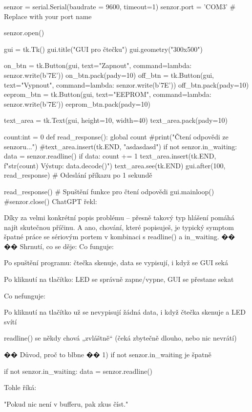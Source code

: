 senzor = serial.Serial(baudrate = 9600, timeout=1)
senzor.port = 'COM3'  # Replace with your port name

senzor.open()

gui = tk.Tk()
gui.title("GUI pro čtečku")
gui.geometry("300x500")

on_btn = tk.Button(gui, text="Zapnout", command=lambda: senzor.write(b'\x7E\xEA\xAB\xCD'))
on_btn.pack(pady=10)
off_btn = tk.Button(gui, text="Vypnout", command=lambda: senzor.write(b'\x7E\xAB\xCD'))
off_btn.pack(pady=10)
eeprom_btn = tk.Button(gui, text="EEPROM", command=lambda: senzor.write(b'\x7E\xDE{}'))
eeprom_btn.pack(pady=10)

text_area = tk.Text(gui, height=10, width=40)
text_area.pack(pady=10)

count:int = 0
def read_response():
    global count
    #print("Čtení odpovědi ze senzoru...")
    #text_area.insert(tk.END, "asdasdasd")
    if not senzor.in_waiting:
        data = senzor.readline()
        if data:
            count += 1
            text_area.insert(tk.END, f"{str(count)} Výstup: {data.decode()}\n")
            text_area.see(tk.END)
    gui.after(100, read_response)  # Odeslání příkazu po 1 sekundě

read_response()  # Spuštění funkce pro čtení odpovědi
gui.mainloop()
#senzor.close()
ChatGPT řekl:

Díky za velmi konkrétní popis problému – přesně takový typ hlášení pomáhá najít skutečnou příčinu.
A ano, chování, které popisuješ, je typický symptom špatné práce se sériovým portem v kombinaci s readline() a in_waiting. ��
�� Shrnutí, co se děje:
Co funguje:

    Po spuštění programu: čtečka skenuje, data se vypisují, i když se GUI seká

    Po kliknutí na tlačítko: LED se správně zapne/vypne, GUI se přestane sekat

Co nefunguje:

    Po kliknutí na tlačítko už se nevypisují žádná data, i když čtečka skenuje a LED svítí

    readline() se někdy chová „zvláštně“ (čeká zbytečně dlouho, nebo nic nevrátí)

�� Důvod, proč to blbne
�� 1) if not senzor.in_waiting je špatně

if not senzor.in_waiting:
    data = senzor.readline()

Tohle říká:

    "Pokud nic není v bufferu, pak zkus číst."

